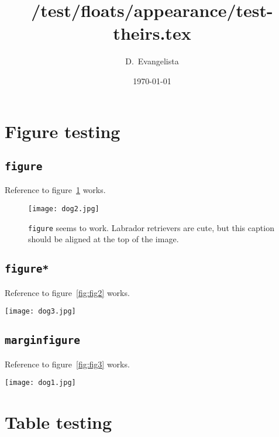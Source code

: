 \documentclass[nols]{tufte-handout}
\title{/test/floats/appearance/test-theirs.tex}
\author{D.~Evangelista}
\date{\today}
\begin{document}
\maketitle

\section{Figure testing}
\subsection{\texttt{figure}}
Reference to figure~\ref{fig:fig1} works.
\begin{figure}[h]
\begin{center}
\texttt{[image: dog2.jpg]}
\end{center}
\caption{\texttt{figure} seems to work. Labrador retrievers are cute, but this caption should be aligned at the top of the image.}
\label{fig:fig1}
\end{figure}

\subsection{\texttt{figure*}}
Reference to figure~\ref{fig:fig2} works.
\begin{figure*}[h]
\begin{center}
\texttt{[image: dog3.jpg]}
\end{center}
\caption{\texttt{figure*} also seems to work, but the width is not as wide as expected when using textwidth or columnwidth? hmmm.}
\label{fig:fig2}
\end{figure*}

\subsection{\texttt{marginfigure}}
Reference to figure~\ref{fig:fig3} works.
\begin{marginfigure}
\begin{center}
\texttt{[image: dog1.jpg]}
\end{center}
\caption{\texttt{marginfigure} here. Puppies are cute.}
\label{fig:fig3}
\end{marginfigure}

\clearpage
\section{Table testing}
\end{document}
